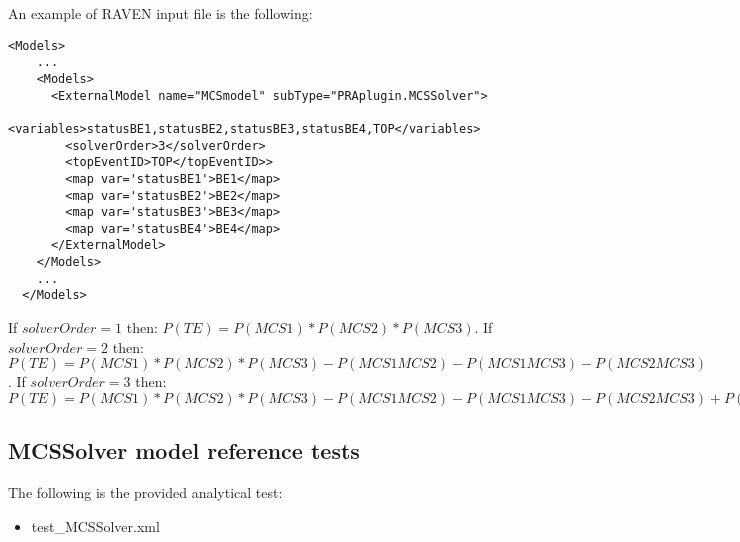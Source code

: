 An example of RAVEN input file is the following:

\begin{lstlisting}[style=XML,morekeywords={anAttribute},caption=MCSSolver model input example., label=lst:MCSSolver_InputExample]
  <Models> 
    ...
    <Models>
      <ExternalModel name="MCSmodel" subType="PRAplugin.MCSSolver">
        <variables>statusBE1,statusBE2,statusBE3,statusBE4,TOP</variables>
        <solverOrder>3</solverOrder>
        <topEventID>TOP</topEventID>>
        <map var='statusBE1'>BE1</map>
        <map var='statusBE2'>BE2</map>
        <map var='statusBE3'>BE3</map>
        <map var='statusBE4'>BE4</map>
      </ExternalModel>
    </Models>
    ...
  </Models>
\end{lstlisting}

If $solverOrder=1$ then: $P(TE) = P(MCS1)*P(MCS2)*P(MCS3)$.  
If $solverOrder=2$ then: $P(TE) = P(MCS1)*P(MCS2)*P(MCS3) - P(MCS1 MCS2) - P(MCS1 MCS3) - P(MCS2 MCS3)$.  
If $solverOrder=3$ then: $P(TE) = P(MCS1)*P(MCS2)*P(MCS3) - P(MCS1 MCS2) - P(MCS1 MCS3) - P(MCS2 MCS3) + P(MCS1 MCS2 MCS3)$

\subsection{MCSSolver model reference tests}
The following is the provided analytical test:
\begin{itemize}
	\item test\_MCSSolver.xml
\end{itemize}



